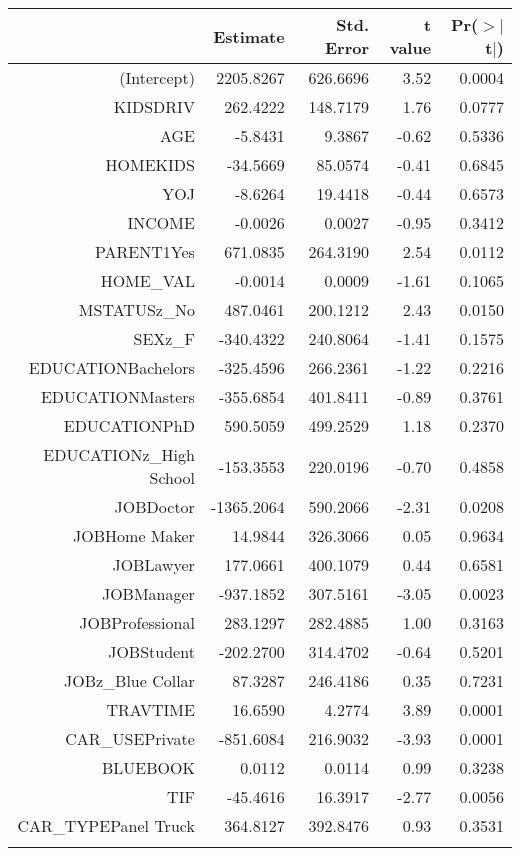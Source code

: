 \documentclass[]{article}
\begin{document}
\begin{tabular}{rrrrr}
  \hline
 & Estimate & Std. Error & t value & Pr($>$$|$t$|$) \\ 
  \hline
(Intercept) & 2205.8267 & 626.6696 & 3.52 & 0.0004 \\ 
  KIDSDRIV & 262.4222 & 148.7179 & 1.76 & 0.0777 \\ 
  AGE & -5.8431 & 9.3867 & -0.62 & 0.5336 \\ 
  HOMEKIDS & -34.5669 & 85.0574 & -0.41 & 0.6845 \\ 
  YOJ & -8.6264 & 19.4418 & -0.44 & 0.6573 \\ 
  INCOME & -0.0026 & 0.0027 & -0.95 & 0.3412 \\ 
  PARENT1Yes & 671.0835 & 264.3190 & 2.54 & 0.0112 \\ 
  HOME\_VAL & -0.0014 & 0.0009 & -1.61 & 0.1065 \\ 
  MSTATUSz\_No & 487.0461 & 200.1212 & 2.43 & 0.0150 \\ 
  SEXz\_F & -340.4322 & 240.8064 & -1.41 & 0.1575 \\ 
  EDUCATIONBachelors & -325.4596 & 266.2361 & -1.22 & 0.2216 \\ 
  EDUCATIONMasters & -355.6854 & 401.8411 & -0.89 & 0.3761 \\ 
  EDUCATIONPhD & 590.5059 & 499.2529 & 1.18 & 0.2370 \\ 
  EDUCATIONz\_High School & -153.3553 & 220.0196 & -0.70 & 0.4858 \\ 
  JOBDoctor & -1365.2064 & 590.2066 & -2.31 & 0.0208 \\ 
  JOBHome Maker & 14.9844 & 326.3066 & 0.05 & 0.9634 \\ 
  JOBLawyer & 177.0661 & 400.1079 & 0.44 & 0.6581 \\ 
  JOBManager & -937.1852 & 307.5161 & -3.05 & 0.0023 \\ 
  JOBProfessional & 283.1297 & 282.4885 & 1.00 & 0.3163 \\ 
  JOBStudent & -202.2700 & 314.4702 & -0.64 & 0.5201 \\ 
  JOBz\_Blue Collar & 87.3287 & 246.4186 & 0.35 & 0.7231 \\ 
  TRAVTIME & 16.6590 & 4.2774 & 3.89 & 0.0001 \\ 
  CAR\_USEPrivate & -851.6084 & 216.9032 & -3.93 & 0.0001 \\ 
  BLUEBOOK & 0.0112 & 0.0114 & 0.99 & 0.3238 \\ 
  TIF & -45.4616 & 16.3917 & -2.77 & 0.0056 \\ 
  CAR\_TYPEPanel Truck & 364.8127 & 392.8476 & 0.93 & 0.3531 \\ 
$$
\end{tabular}
\end{document}
